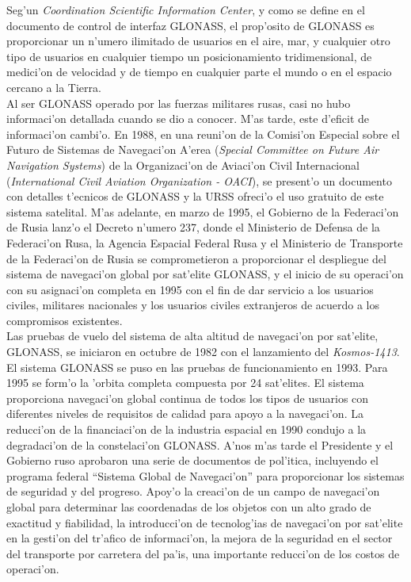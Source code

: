 Seg'un \emph{Coordination Scientific Information Center}, y como se define en el documento de control de interfaz GLONASS, el prop'osito de GLONASS es proporcionar un n'umero ilimitado de usuarios en el aire, mar, y cualquier otro tipo de usuarios en cualquier tiempo un posicionamiento tridimensional, de medici'on de velocidad y de tiempo en cualquier parte el mundo o en el espacio cercano a la Tierra.\\

Al ser GLONASS operado por las fuerzas militares rusas, casi no hubo informaci'on detallada cuando se dio a conocer. M'as tarde, este d'eficit de informaci'on cambi'o. En 1988, en una reuni'on de la Comisi'on Especial sobre el Futuro de Sistemas de Navegaci'on A'erea (\emph{Special Committee on Future Air Navigation Systems}) de la Organizaci'on de Aviaci'on Civil Internacional (\emph{International Civil Aviation Organization - OACI}), se present'o un documento con detalles t'ecnicos de GLONASS y la URSS ofreci'o el uso gratuito de este sistema satelital. M'as adelante, en marzo de 1995, el Gobierno de la Federaci'on de Rusia lanz'o el Decreto n'umero 237, donde el Ministerio de Defensa de la Federaci'on Rusa, la Agencia Espacial Federal Rusa y el Ministerio de Transporte de la Federaci'on de Rusia se comprometieron a proporcionar el despliegue del sistema de navegaci'on global por sat'elite GLONASS, y el inicio de su operaci'on con su asignaci'on completa en 1995 con el fin de dar servicio a los usuarios civiles, militares nacionales y los usuarios civiles extranjeros de acuerdo a los compromisos existentes.\\

Las pruebas de vuelo del sistema de alta altitud de navegaci'on por sat'elite, GLONASS, se iniciaron en octubre de 1982 con el lanzamiento del \emph{Kosmos-1413}. El sistema GLONASS se puso en las pruebas de funcionamiento en 1993. Para 1995 se form'o la 'orbita completa compuesta por 24 sat'elites. El sistema proporciona navegaci'on global continua de todos los tipos de usuarios con diferentes niveles de requisitos de calidad para apoyo a la navegaci'on. La reducci'on de la financiaci'on de la industria espacial en 1990 condujo a la degradaci'on de la constelaci'on GLONASS. A'nos m'as tarde el Presidente y el Gobierno ruso aprobaron una serie de documentos de pol'itica, incluyendo el programa federal ``Sistema Global de Navegaci'on'' para proporcionar los sistemas de seguridad y del progreso. Apoy'o la creaci'on de un campo de navegaci'on global para determinar las coordenadas de los objetos con un alto grado de exactitud y fiabilidad, la introducci'on de tecnolog'ias de navegaci'on por sat'elite en la gesti'on del tr'afico de informaci'on, la mejora de la seguridad en el sector del transporte por carretera del pa'is, una importante reducci'on de los costos de operaci'on.

